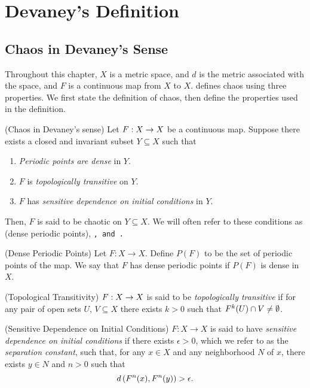 \documentclass[10pt,draft,twoside]{book}
\begin{document}
\chapter{Devaney's Definition}
\label{chap:devaney}
\section{Chaos in Devaney's Sense}
Throughout this chapter, $X$ is a metric space, and $d$ is the metric associated with the space, and $F$ is a continuous map from $X$ to $X$.
\citet{devaney} defines chaos using three properties.
We first state the definition of chaos, then define the properties used in the definition.
\begin{definition}
  (Chaos in Devaney's sense) 
  Let $F: X\rightarrow X$ be a continuous map.
  Suppose there exists a closed and invariant subset $Y \subseteq X$ such that
  \begin{enumerate}
    \item \textit{Periodic points are dense} in $Y$.
    \item $F$ is \textit{topologically transitive} on $Y$.
    \item $F$ has \textit{sensitive dependence on initial conditions} in $Y$.
  \end{enumerate}
  Then, $F$ is said to be chaotic on $Y \subseteq X$.
  We will often refer to these conditions as \dpp (dense periodic points), \tt, and \sdic.
\end{definition}
%
\begin{definition}
  (Dense Periodic Points) 
  Let $F: X \to X$.
  Define $P(F)$ to be the set of periodic points of the map.
  We say that $F$ has dense periodic points if $P(F)$ is dense in $X$.
\end{definition}
%
\begin{definition}
  (Topological Transitivity) 
  $F: X \rightarrow X$ is said to be \textit{topologically transitive} if for any pair of open sets $U$, $V \subseteq X$ there exists $k > 0$ such that $F^{k}(U) \cap V \neq \emptyset$.
  \label{defn:transitivity}
   \end{definition}
%
\begin{definition}
  (Sensitive Dependence on Initial Conditions) 
  $F: X \rightarrow X$ is said to have \textit{sensitive dependence on initial conditions} if there exists $\epsilon > 0$, which we refer to as the \textit{separation constant}, such that, for any $x \in X$ and any neighborhood $N$ of $x$, there exists $y\in N$ and $n > 0$ such that 
  \begin{equation*}
    d\left( F^{n}(x), F^{n}(y) \right) > \epsilon.
  \end{equation*}
  \label{defn:sdic}
\end{definition}
\end{document}
